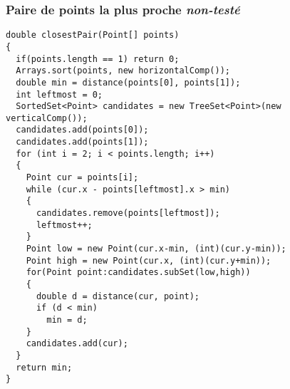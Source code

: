 \subsubsection{Paire de points la plus proche {\footnotesize \textit{non-testé}}}
\begin{lstlisting}
double closestPair(Point[] points)
{
  if(points.length == 1) return 0;
  Arrays.sort(points, new horizontalComp());
  double min = distance(points[0], points[1]);
  int leftmost = 0;
  SortedSet<Point> candidates = new TreeSet<Point>(new verticalComp());  
  candidates.add(points[0]);
  candidates.add(points[1]);
  for (int i = 2; i < points.length; i++)
  {
    Point cur = points[i];
    while (cur.x - points[leftmost].x > min)
    {
      candidates.remove(points[leftmost]);
      leftmost++;
    }
    Point low = new Point(cur.x-min, (int)(cur.y-min));
    Point high = new Point(cur.x, (int)(cur.y+min));
    for(Point point:candidates.subSet(low,high))
    {
      double d = distance(cur, point);
      if (d < min)
        min = d;
    }
    candidates.add(cur);
  }
  return min;
}
\end{lstlisting}
